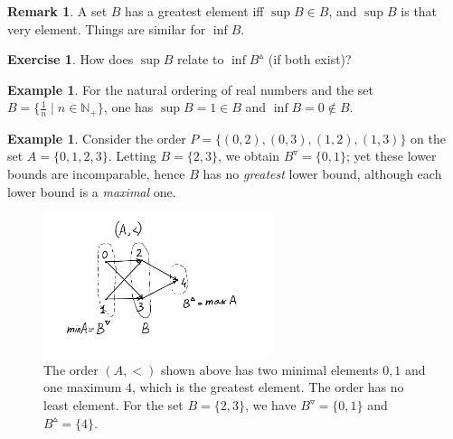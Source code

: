 \documentclass[12pt,notitlepage]{article}
\theoremstyle{plain}
\theoremstyle{definition}
\newtheorem{exc}[thm]{Exercise}
\newtheorem{exm}[thm]{Example}
\newtheorem{rem}[thm]{Remark}
\theoremstyle{plain}
\newcommand{\N}{\mathbb{N}}
\newcommand{\1}{\mathbf{1}}
\newcommand{\0}{\mathbf{0}}
\begin{document}
\begin{rem}
A set $B$ has a greatest element iff $\sup B \in B$, and $\sup B$ is that very element. Things are similar for $\inf B$.
\end{rem}
\begin{exc}
How does $\sup B$ relate to $\inf B^\vartriangle$ (if both exist)?
\end{exc}

\begin{exm}
For the natural ordering of real numbers and the set $B = \{ \frac{1}{n} \mid n \in \N_+ \}$, one has $\sup B = 1 \in B$ and $\inf B = 0 \notin B$.
\end{exm}

\begin{exm}
Consider the order $P = \{(0,2), (0,3), (1,2), (1,3)\}$ on the set $A = \{0,1,2,3\}$. Letting $B = \{2,3\}$, we obtain $B^\triangledown = \{ 0, 1\}$; yet these lower bounds are incomparable, hence $B$ has no \emph{greatest} lower bound, although each lower bound is a \emph{maximal} one.
\end{exm}

\begin{figure}[h]
\centering
\includegraphics*[width=0.6\textwidth]{min_max.pdf}
\caption{The order $(A, <)$ shown above has two minimal elements $0, 1$ and one maximum $4$, which is the greatest element. The order has no least element. For the set $B = \{2,3\}$, we have $B^\triangledown = \{ 0, 1\}$ and $B^\vartriangle = \{ 4\}$.}
\end{figure}
\end{document}
